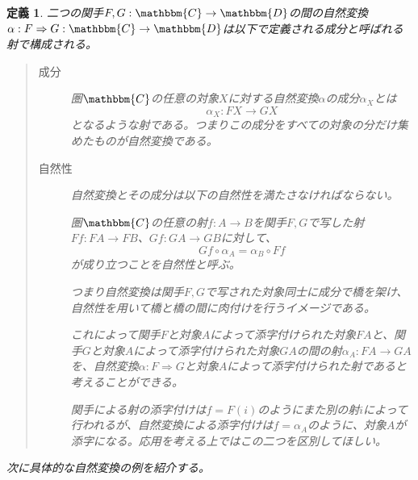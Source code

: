 \documentclass[uplatex,dvipdfmx]{jsarticle}
\newcommand{\cat}[1]{\mathbbm{#1}}
\newcommand{\arrow}{\rightarrow}
\newcommand{\functor}[3]{#1:\cat{#2}\arrow \cat{#3}}
\newcommand{\nat}[3]{#1:#2\Rightarrow #3}
\newcommand{\natf}[5]{#1:#2\Rightarrow #3:\cat{#4}\arrow \cat{#5}}
\newcommand{\mor}[3]{#1:#2\arrow #3}
\newtheorem{define}{定義}[section]
\numberwithin{proof}{subsection}
\numberwithin{prop}{subsection}
\numberwithin{define}{subsection}
\begin{document}
  \begin{define}
		二つの関手$\functor{F,G}{C}{D}$の間の自然変換$\natf{\alpha}{F}{G}{C}{D}$は以下で定義される成分と呼ばれる射で構成される。
		\begin{quote}
			\begin{description}
				\item[成分] 圏$\cat{C}$の任意の対象$X$に対する自然変換$\alpha$の成分$\alpha_X$とは\[\mor{\alpha_X}{FX}{GX}\]となるような射である。つまりこの成分をすべての対象の分だけ集めたものが自然変換である。
				\item[自然性]
				自然変換とその成分は以下の自然性を満たさなければならない。

				圏$\cat{C}$の任意の射$\mor{f}{A}{B}$を関手$F,G$で写した射$\mor{Ff}{FA}{FB}$、$\mor{Gf}{GA}{GB}$に対して、\[Gf\circ\alpha_A=\alpha_B\circ Ff\]が成り立つことを自然性と呼ぶ。
				\begin{center}
				\end{center}
				つまり自然変換は関手$F,G$で写された対象同士に成分で橋を架け、自然性を用いて橋と橋の間に肉付けを行うイメージである。
        
        これによって関手$F$と対象$A$によって添字付けられた対象$FA$と、関手$G$と対象$A$によって添字付けられた対象$GA$の間の射$\mor{\alpha_A}{FA}{GA}$を、自然変換$\nat{\alpha}{F}{G}$と対象$A$によって添字付けられた射であると考えることができる。

        関手による射の添字付けは$f=F(i)$のようにまた別の射$i$によって行われるが、自然変換による添字付けは$f=\alpha_A$のように、対象$A$が添字になる。応用を考える上ではこの二つを区別してほしい。
			\end{description}
		\end{quote}
		次に具体的な自然変換の例を紹介する。
	\end{define}
\end{document}
